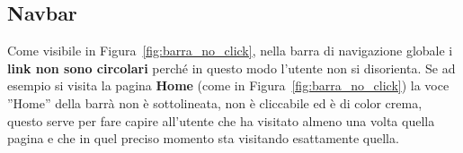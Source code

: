 \documentclass[10pt, a4paper]{article}
\begin{document}
\subsection{Navbar}
Come visibile in Figura~\ref{fig:barra_no_click}, nella barra di navigazione globale
i \textbf{link non sono circolari} perché in questo modo l'utente non si
disorienta. Se ad esempio si visita la pagina \textbf{\textcolor{UniPD}{Home}} 
(come in Figura~\ref{fig:barra_no_click}) la voce ''\textcolor{UniPD}{Home}'' della
barrà non è sottolineata, non è cliccabile ed è di color \textcolor{Crema}{crema}, questo serve per
fare capire all'utente che ha visitato almeno una volta quella pagina e che in quel
preciso momento sta visitando esattamente quella.

\end{document}
